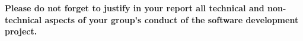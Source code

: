 %

\vspace{10ex}

\textbf{Please do not forget to justify in your report all technical and non-technical aspects of your group's conduct of the software development project.}




\cleardoublepage
\setcounter{page}{1} %
\pagestyle{scrheadings} %
